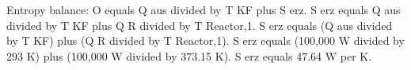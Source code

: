 Entropy balance:  
O equals Q aus divided by T KF plus S erz.  
S erz equals Q aus divided by T KF plus Q R divided by T Reactor,1.  
S erz equals (Q aus divided by T KF) plus (Q R divided by T Reactor,1).  
S erz equals (100,000 W divided by 293 K) plus (100,000 W divided by 373.15 K).  
S erz equals 47.64 W per K.